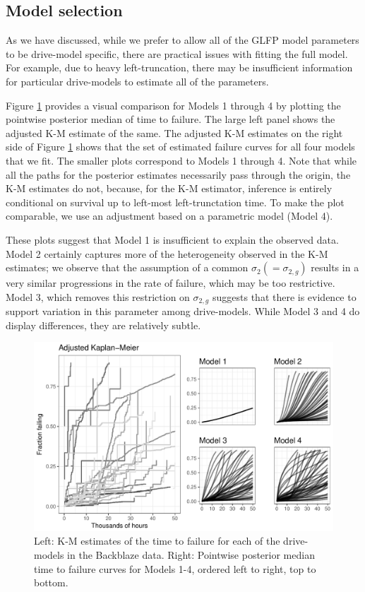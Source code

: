 \documentclass[aoas]{imsart}
\begin{document}
\subsection{Model selection}
\label{sec:Model Comparisons}
As we have discussed, while we prefer to allow all of the GLFP model parameters to be drive-model specific, there are practical issues with fitting the full model. For example, due to heavy left-truncation, there may be insufficient information for particular drive-models to estimate all of the parameters. 

Figure \ref{fig:fig2} provides a visual comparison for Models 1 through 4 by plotting the pointwise posterior median of time to failure. The large left panel shows the adjusted K-M estimate of the same. The adjusted K-M estimates on the right side of Figure \ref{fig:fig2} shows that the set of estimated failure curves for all four models that we fit. The smaller plots correspond to Models 1 through 4.  Note that while all the paths for the posterior estimates necessarily pass through the origin, the K-M estimates do not, because, for the K-M estimator, inference is entirely conditional on survival up to left-most left-trunctation time. To make the plot comparable, we use an adjustment based on a parametric model (Model 4).

These plots suggest that Model 1 is insufficient to explain the observed data. Model 2 certainly captures more of the heterogeneity observed in the K-M estimates; we observe that the assumption of a common $\sigma_2(=\sigma_{2,g})$ results in a very similar progressions in the rate of failure, which may be too restrictive. Model 3, which removes this restriction on $\sigma_{2,g}$ suggests that there is evidence to support variation in this parameter among drive-models. While Model 3 and 4 do display differences, they are relatively subtle.

\begin{figure}[H]
\includegraphics[width=\textwidth]{heterogeneity-compare}
\caption{Left: K-M estimates of the time to failure for each of the drive-models in the Backblaze data. Right: Pointwise posterior median time to failure curves for Models 1-4, ordered left to right, top to bottom.}
\label{fig:fig2}
\end{figure}
\end{document}

